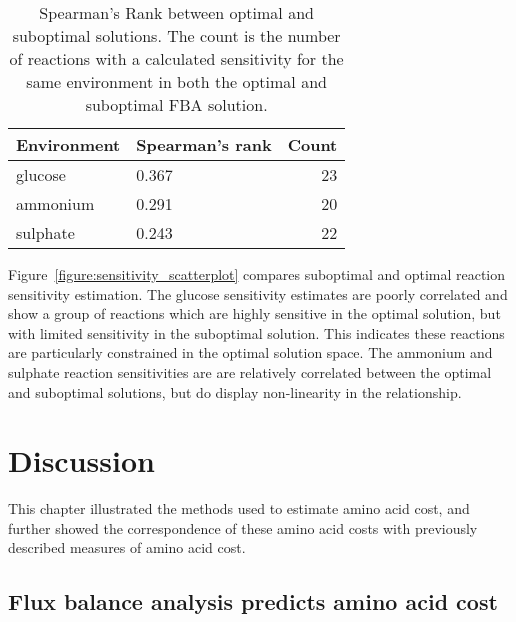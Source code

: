 \begin{table}%
  \centering
  \begin{tabular}{l l r}
                                             \toprule
    Environment & Spearman's rank & Count \\ \midrule
    glucose     & 0.367           & 23    \\
    ammonium    & 0.291           & 20    \\
    sulphate    & 0.243           & 22    \\ \bottomrule
  \end{tabular}
  \caption[Spearman's Rank between optimal and suboptimal solutions]{Spearman's Rank between optimal and suboptimal solutions. The count is the number of reactions with a calculated sensitivity for the same environment in both the optimal and suboptimal FBA solution. }
  \label{table:sensitivity_correlation}
\end{table}%


Figure~\vref{figure:sensitivity_scatterplot} compares suboptimal and optimal reaction sensitivity estimation. The glucose sensitivity estimates are poorly correlated and show a group of reactions which are highly sensitive in the optimal solution, but with limited sensitivity in the suboptimal solution. This indicates these reactions are particularly constrained in the optimal solution space. The ammonium and sulphate reaction sensitivities are are relatively correlated between the optimal and suboptimal solutions, but do display non-linearity in the relationship.

\clearpage

\section{Discussion}%

This chapter illustrated the methods used to estimate amino acid cost, and further showed the correspondence of these amino acid costs with previously described measures of amino acid cost.

\subsection{Flux balance analysis predicts amino acid cost}%

